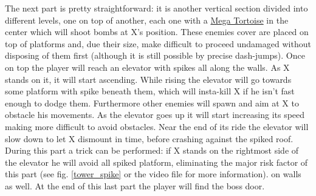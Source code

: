 The next part is pretty straightforward: it is another vertical section divided into different levels, one on top of another, each one with a \hyperlink{enem:Mega_Tortoise}{Mega Tortoise} in the center which will shoot bombs at X's position. These enemies cover are placed on top of platforms and, due their size, make difficult to proceed undamaged without disposing of them first (although it is still possible by precise dash-jumps). Once on top the player will reach an elevator with spikes all along the walls. As X stands on it, it will start ascending. While rising the elevator will go towards some platform with spike beneath them, which will insta-kill X if he isn't fast enough to dodge them. Furthermore other enemies will spawn and aim at X to obstacle his movements. As the elevator goes up it will start increasing its speed making more difficult to avoid obstacles. Near the end of its ride the elevator will slow down to let X dismount in time, before crashing against the spiked roof. During this part a trick can be performed: if X stands on the rightmost side of the elevator he will avoid all spiked platform, eliminating the major risk factor of this part (see fig. \ref{tower_spike} or the video file  for more information). 
on walls as well. At the end of this last part the player will find the boss door.
